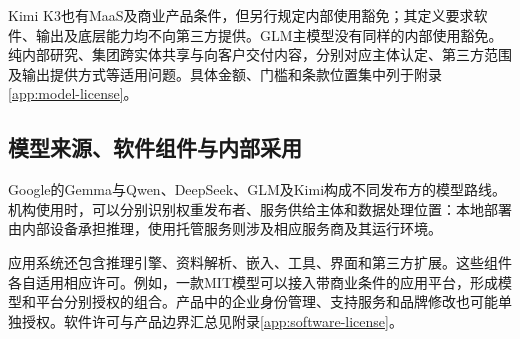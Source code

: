 Kimi K3也有MaaS及商业产品条件，但另行规定内部使用豁免；其定义要求软件、输出及底层能力均不向第三方提供。GLM主模型没有同样的内部使用豁免。纯内部研究、集团跨实体共享与向客户交付内容，分别对应主体认定、第三方范围及输出提供方式等适用问题。具体金额、门槛和条款位置集中列于附录\ref{app:model-license}。

\subsection{模型来源、软件组件与内部采用}
Google的Gemma与Qwen、DeepSeek、GLM及Kimi构成不同发布方的模型路线。机构使用时，可以分别识别权重发布者、服务供给主体和数据处理位置：本地部署由内部设备承担推理，使用托管服务则涉及相应服务商及其运行环境。

应用系统还包含推理引擎、资料解析、嵌入、工具、界面和第三方扩展。这些组件各自适用相应许可。例如，一款MIT模型可以接入带商业条件的应用平台，形成模型和平台分别授权的组合。产品中的企业身份管理、支持服务和品牌修改也可能单独授权。软件许可与产品边界汇总见附录\ref{app:software-license}。

